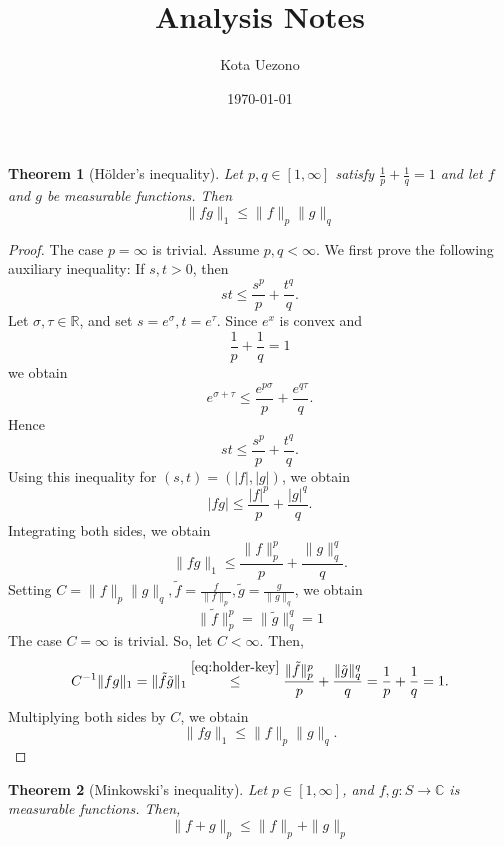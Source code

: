 \documentclass[a4paper,11pt]{article}
\title{Analysis Notes}
\author{Kota Uezono}
\date{\today}
\newtheorem{thm}{Theorem}[section]
\theoremstyle{definition}
\theoremstyle{remark}
\begin{document}
\maketitle

\begin{thm}[H\"older's inequality]
    Let $p,q\in[1, \infty]$ satisfy
    $\frac{1}{p}+\frac{1}{q}=1$
    and let $f$ and $g$ be measurable functions.
    Then
    \[
    \|fg\|_{1}
    \le
    \|f\|_{p}\|g\|_{q}
    \]
\end{thm}

\begin{proof}
    The case $p=\infty$ is trivial.
    Assume $p,q<\infty$.
    We first prove the following auxiliary inequality:
    If $s,t>0$, then
    \[
    st\le\frac{s^p}{p}+\frac{t^q}{q}.
    \]
    Let $\sigma,\tau\in\mathbb{R}$, and set $s=e^{\sigma},t=e^{\tau}$.
    Since $e^x$ is convex and
    \[
    \frac{1}{p}+\frac{1}{q}=1
    \]
    we obtain
    \[
    e^{\sigma+\tau} \le \frac{e^{p\sigma}}{p}+\frac{e^{q\tau}}{q}.
    \]
    Hence
    \[
    st\le\frac{s^p}{p}+\frac{t^q}{q}.
    \]
    Using this inequality for $(s,t)=(|f|,|g|)$, we obtain
    \[
    |fg|\le\frac{|f|^p}{p}+\frac{|g|^q}{q}.
    \]
    Integrating both sides, we obtain
    \begin{equation}
    \|fg\|_{1}\le\frac{\|f\|_{p}^{p}}{p}+\frac{\|g\|_{q}^{q}}{q}.
    \label{eq:holder-key}
    \end{equation}
    Setting $C=\|f\|_{p}\|g\|_{q},\tilde{f}=\frac{f}{\|f\|_{p}},\tilde{g}=\frac{g}{\|g\|_{q}}$,
    we obtain
    \[
    \|\tilde{f}\|_{p}^{p}=\|\tilde{g}\|_{q}^{q}=1
    \]
    The case $C=\infty$ is trivial.
    So, let $C<\infty$.
    Then, 
    \[
    C^{-1}\|fg\|_{1}=\|\tilde{f}\tilde{g}\|_{1}\overset{\eqref{eq:holder-key}}\le\frac{\|\tilde{f}\|_{p}^{p}}{p}+\frac{\|\tilde{g}\|_{q}^{q}}{q}=\frac1p+\frac1q=1.
    \]
    Multiplying both sides by $C$, we obtain
    \[
    \|fg\|_1 \le \|f\|_p\|g\|_q.
    \]


\end{proof}

\begin{thm}[Minkowski's inequality]
    Let $p\in[1,\infty]$, and $f,g:S\to\mathbb{C}$ is measurable functions. Then,
    \[
    \|f+g\|_{p}\le\|f\|_{p}+\|g\|_{p}
    \]
\end{thm}
\end{document}
